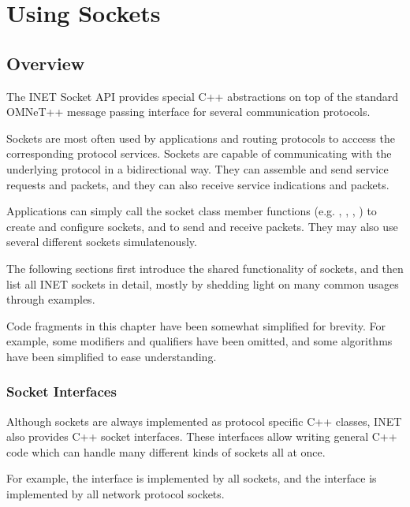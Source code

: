 \chapter{Using Sockets}
\label{cha:sockets}

\section{Overview}
\label{sec:sockets:overview}

The INET Socket API provides special C++ abstractions on top of the standard
OMNeT++ message passing interface for several communication protocols.

Sockets are most often used by applications and routing protocols to acccess the
corresponding protocol services. Sockets are capable of communicating with the
underlying protocol in a bidirectional way. They can assemble and send service
requests and packets, and they can also receive service indications and packets.

Applications can simply call the socket class member functions (e.g.
, , , ) to create
and configure sockets, and to send and receive packets. They may also use
several different sockets simulatenously.

The following sections first introduce the shared functionality of sockets, and
then list all INET sockets in detail, mostly by shedding light on many common
usages through examples.

\begin{note}
Code fragments in this chapter have been somewhat simplified for brevity. For
example, some  modifiers and  qualifiers have been
omitted, and some algorithms have been simplified to ease understanding.
\end{note}

\subsection*{Socket Interfaces}

Although sockets are always implemented as protocol specific C++ classes, INET
also provides C++ socket interfaces. These interfaces allow writing general C++
code which can handle many different kinds of sockets all at once.

For example, the  interface is implemented by all sockets, and
the  interface is implemented by all network protocol
sockets.

